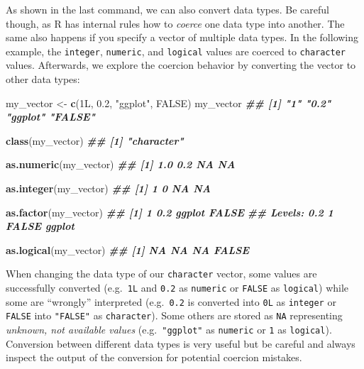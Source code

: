 \documentclass[
]{krantz}
\makeatletter
\newenvironment{Shaded}{\begin{snugshade}}{\end{snugshade}}
\newcommand{\ConstantTok}[1]{\textcolor[rgb]{0.37,0.37,0.37}{#1}}
\newcommand{\DocumentationTok}[1]{\textcolor[rgb]{0.37,0.37,0.37}{\textbf{\textit{#1}}}}
\newcommand{\FloatTok}[1]{\textcolor[rgb]{0.06,0.06,0.06}{#1}}
\newcommand{\FunctionTok}[1]{\textcolor[rgb]{0.27,0.27,0.27}{\textbf{#1}}}
\newcommand{\NormalTok}[1]{#1}
\newcommand{\OtherTok}[1]{\textcolor[rgb]{0.37,0.37,0.37}{#1}}
\newcommand{\SpecialCharTok}[1]{\textcolor[rgb]{0.43,0.43,0.43}{\textbf{#1}}}
\newcommand{\StringTok}[1]{\textcolor[rgb]{0.5,0.5,0.5}{#1}}
\newenvironment{kframe}{%
\medskip{}
\setlength{\fboxsep}{.8em}
 \def\at@end@of@kframe{}%
 \ifinner\ifhmode%
  \def\at@end@of@kframe{\end{minipage}}%
  \begin{minipage}{\columnwidth}%
 \fi\fi%
 \def\FrameCommand##1{\hskip\@totalleftmargin \hskip-\fboxsep
 \colorbox{shadecolor}{##1}\hskip-\fboxsep
     \hskip-\linewidth \hskip-\@totalleftmargin \hskip\columnwidth}%
 \MakeFramed {\advance\hsize-\width
   \@totalleftmargin\z@ \linewidth\hsize
   \@setminipage}}%
 {\par\unskip\endMakeFramed%
 \at@end@of@kframe}
\renewenvironment{Shaded}{\begin{kframe}}{\end{kframe}}
\makeatother
\begin{document}
\begin{Shaded}
\end{Shaded}

As shown in the last command, we can also convert data types. Be careful though, as R has internal rules how to \emph{coerce} one data type into another. The same also happens if you specify a vector of multiple data types. In the following example, the \texttt{integer}, \texttt{numeric}, and \texttt{logical} values are coerced to \texttt{character} values. Afterwards, we explore the coercion behavior by converting the vector to other data types:

\begin{Shaded}
\begin{Highlighting}[]
\NormalTok{my\_vector }\OtherTok{\textless{}{-}} \FunctionTok{c}\NormalTok{(1L, }\FloatTok{0.2}\NormalTok{, }\StringTok{"ggplot"}\NormalTok{, }\ConstantTok{FALSE}\NormalTok{)}
\NormalTok{my\_vector}
\DocumentationTok{\#\# [1] "1"      "0.2"    "ggplot" "FALSE"}

\FunctionTok{class}\NormalTok{(my\_vector)}
\DocumentationTok{\#\# [1] "character"}

\FunctionTok{as.numeric}\NormalTok{(my\_vector)}
\DocumentationTok{\#\# [1] 1.0 0.2  NA  NA}

\FunctionTok{as.integer}\NormalTok{(my\_vector)}
\DocumentationTok{\#\# [1]  1  0 NA NA}

\FunctionTok{as.factor}\NormalTok{(my\_vector)}
\DocumentationTok{\#\# [1] 1      0.2    ggplot FALSE }
\DocumentationTok{\#\# Levels: 0.2 1 FALSE ggplot}

\FunctionTok{as.logical}\NormalTok{(my\_vector)}
\DocumentationTok{\#\# [1]    NA    NA    NA FALSE}
\end{Highlighting}
\end{Shaded}

When changing the data type of our \texttt{character} vector, some values are successfully converted (e.g.~\texttt{1L} and \texttt{0.2} as \texttt{numeric} or \texttt{FALSE} as \texttt{logical}) while some are ``wrongly'' interpreted (e.g.~\texttt{0.2} is converted into \texttt{0L} as \texttt{integer} or \texttt{FALSE} into \texttt{"FALSE"} as \texttt{character}). Some others are stored as \texttt{NA} representing \emph{unknown, not available values} (e.g.~\texttt{"ggplot"} as \texttt{numeric} or \texttt{1} as \texttt{logical}). Conversion between different data types is very useful but be careful and always inspect the output of the conversion for potential coercion mistakes.
\end{document}
